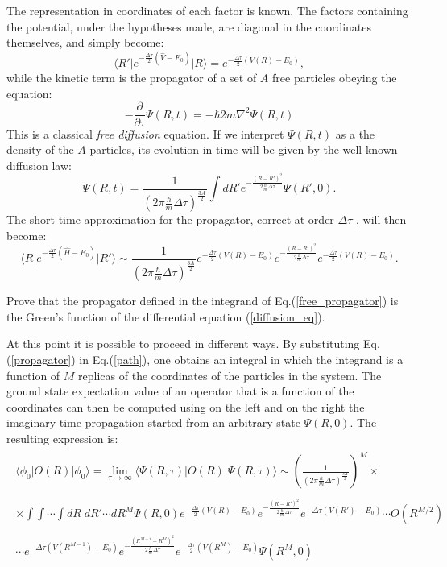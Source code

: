 The representation in coordinates of each factor is known. The factors containing the potential, under the hypotheses made, are diagonal in the coordinates themselves, and simply become:
\begin{equation}
\langle R'\vert e^{-\frac{\Delta\tau}{2}(\hat{V}-E_0)}\vert R\rangle = e^{-\frac{\Delta\tau}{2}(V(R)-E_0)},
\end{equation}
while the kinetic term is the propagator of a set of $A$ free particles obeying the equation:
\begin{equation}
-\frac{\partial}{\partial\tau}\Psi(R,t)=-{\hbar}{2m}\nabla^2\Psi(R,t)\label{diffusion_eq}
\end{equation}
This is a classical {\it free diffusion} equation. If we interpret $\Psi(R,t)$ as a the density of the $A$ particles, its evolution in time will be given by the well known diffusion law:
\begin{equation}
\Psi(R,t)=\frac{1}{(2\pi\frac{\hbar}{m}\Delta\tau)^\frac{3A}{2}}\int dR'e^{-\frac{(R-R')^2}{2\frac{\hbar}{m}\Delta\tau}}\Psi(R',0).\label{free_propagator}
\end{equation}
The short-time approximation for the propagator, correct at order $\Delta\tau$ , will then become:
\begin{equation}
\langle R\vert e^{-\frac{\Delta\tau}{2}(\hat{H}-E_0)}\vert R'\rangle\sim\frac{1}{(2\pi\frac{\hbar}{m}\Delta\tau)^\frac{3A}{2}}e^{-\frac{\Delta\tau}{2}(V(R)-E_0)} e^{-\frac{(R-R')^2}{2\frac{\hbar}{m}\Delta\tau}}e^{-\frac{\Delta\tau}{2}(V(R)-E_0)}.\label{propagator}
\end{equation}
\begin{prob}
	Prove that the propagator defined in the integrand of Eq.(\ref{free_propagator}) is the Green's function of the differential equation (\ref{diffusion_eq}).
\end{prob}
At this point it is possible to proceed in different ways. By substituting Eq.(\ref{propagator}) in Eq.(\ref{path}), one obtains an integral in which the integrand is a function of $M$ replicas of the coordinates of the particles in the system. The ground state expectation value of an operator that is a function of the coordinates can then  be computed using on the left and on the right the imaginary time propagation started from an arbitrary state $\Psi(R,0)$. The resulting expression is:
\begin{eqnarray}
\begin{array}{c}
\langle \phi_0|O(R)|\phi_0\rangle = 
\displaystyle\lim_{\tau\rightarrow\infty}\langle \Psi(R,\tau)|O(R)|\Psi(R,\tau)\rangle\sim\left(\frac{1}{(2\pi\frac{\hbar}{m}\Delta\tau)^\frac{3A}{2}}\right)^M\times\\ \\
\times\displaystyle \int\int\cdots\int dR\;dR'\cdots dR^M\Psi(R,0)e^{-\frac{\Delta\tau}{2}(V(R)-E_0)} e^{-\frac{(R-R')^2}{2\frac{\hbar}{m}\Delta\tau}}e^{-\Delta\tau(V(R')-E_0)}
\cdots O(R^{M/2}) \\ \\
\displaystyle
\cdots e^{-{\Delta\tau}(V(R^{M-1})-E_0)} e^{-\frac{(R^{M-1}-R^M)^2}{2\frac{\hbar}{m}\Delta\tau}}e^{-\frac{\Delta\tau}{2}(V(R^M)-E_0)}\Psi(R^M,0)
\end{array}
\end{eqnarray}	
